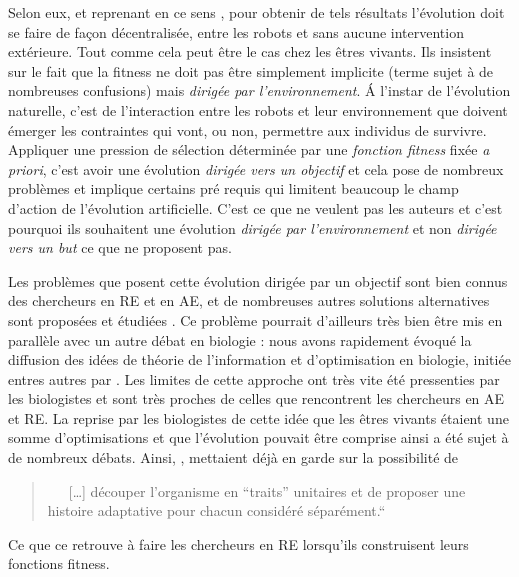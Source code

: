 Selon eux, et reprenant en ce sens \cite{watson02embodiedevolutiondistributingevolutionaryalgorithmpopulationrobots}, pour obtenir de tels résultats l'évolution doit se faire de façon décentralisée, entre les robots et sans aucune intervention extérieure. Tout comme cela peut être le cas chez les êtres vivants. Ils insistent sur le fait que la fitness ne doit pas être simplement implicite (terme sujet à de nombreuses confusions) mais \emph{dirigée par l'environnement}. \'A l'instar de l'évolution naturelle, c'est de l'interaction entre les robots et leur environnement que doivent émerger les contraintes qui vont, ou non, permettre aux individus de survivre. Appliquer une pression de sélection déterminée par une \emph{fonction fitness} fixée \emph{a priori}, c'est avoir une évolution \emph{dirigée vers un objectif} et cela pose de nombreux problèmes et implique certains pré requis qui limitent beaucoup le champ d'action de l'évolution artificielle. C'est ce que ne veulent pas les auteurs et c'est pourquoi ils souhaitent une évolution \emph{dirigée par l'environnement} et non \emph{dirigée vers un but} ce que \cite{watson02embodiedevolutiondistributingevolutionaryalgorithmpopulationrobots} ne proposent pas.

Les problèmes que posent cette évolution dirigée par un objectif sont bien connus des chercheurs en RE et en AE, et de nombreuses autres solutions alternatives sont proposées et étudiées \citep{lehman10efficientlyevolvingprogramsthroughsearchnovelty,lehman2011abandoningobjectivesevolutionthroughthesearchfornoveltyalone,risi2009hownoveltysearchescapesthedeceptivetrapoflearningtolearn,mouret2012encouragingbehavioraldiversityinevolutionaryrobotics}. Ce problème pourrait d'ailleurs très bien être mis en parallèle avec un autre débat en biologie : nous avons rapidement évoqué la diffusion des idées de théorie de l'information et d'optimisation en biologie, initiée entres autres par \cite{maynardsmith78optimizationtheoryinevolution}. Les limites de cette approche ont très vite été pressenties par les biologistes et sont très proches de celles que rencontrent les chercheurs en AE et RE. La reprise par les biologistes de cette idée que les êtres vivants étaient une somme d'optimisations et que l'évolution pouvait être comprise ainsi a été sujet à de nombreux débats.
Ainsi, \cite{gould1979spandrelssanmarcopanglossianparadigmcritiqueadaptationistprogramme}, mettaient déjà en garde sur la possibilité de

\begin{quote}
   [\ldots] découper l'organisme en ``traits'' unitaires et de proposer une histoire adaptative pour chacun considéré séparément.``
\end{quote}
Ce que ce retrouve à faire les chercheurs en RE lorsqu'ils construisent leurs fonctions fitness.

